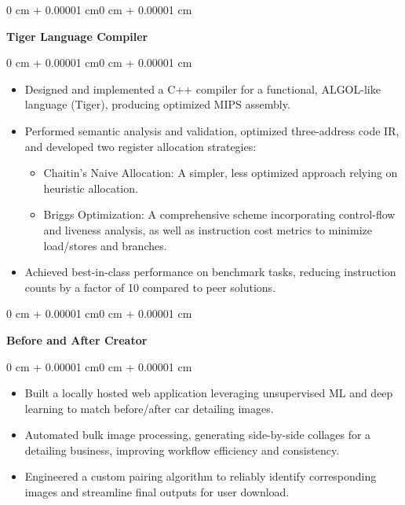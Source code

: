 \documentclass[10pt, letterpaper]{article}
\newenvironment{highlights}{
    \begin{itemize}[
        topsep=0.10 cm,
        parsep=0.10 cm,
        partopsep=0pt,
        itemsep=0pt,
        leftmargin=0.4 cm + 10pt
    ]
}{
    \end{itemize}
}
\newenvironment{onecolentry}{
    \begin{adjustwidth}{0 cm + 0.00001 cm}{0 cm + 0.00001 cm}
}{
    \end{adjustwidth}
}
\begin{document}
\vspace{0.4 cm}

\begin{onecolentry}
    \textbf{Tiger Language Compiler}
\end{onecolentry}

\vspace{0.10 cm}
\begin{onecolentry}
    \begin{highlights}
        \item Designed and implemented a C++ compiler for a functional, ALGOL-like language (Tiger), producing optimized MIPS assembly.
        \item Performed semantic analysis and validation, optimized three-address code IR, and developed two register allocation strategies:
        \begin{itemize}
            \item Chaitin’s Naive Allocation: A simpler, less optimized approach relying on heuristic allocation.
            \item Briggs Optimization: A comprehensive scheme incorporating control-flow and liveness analysis, as well as instruction cost metrics to minimize load/stores and branches.
        \end{itemize}
        \item Achieved best-in-class performance on benchmark tasks, reducing instruction counts by a factor of 10 compared to peer solutions.
    \end{highlights}
\end{onecolentry}

\vspace{0.4 cm}

\begin{onecolentry}
    \textbf{Before and After Creator}
\end{onecolentry}

\vspace{0.10 cm}
\begin{onecolentry}
    \begin{highlights}
        \item Built a locally hosted web application leveraging unsupervised ML and deep learning to match before/after car detailing images.
        \item Automated bulk image processing, generating side-by-side collages for a detailing business, improving workflow efficiency and consistency.
        \item Engineered a custom pairing algorithm to reliably identify corresponding images and streamline final outputs for user download.
    \end{highlights}
\end{onecolentry}
\end{document}
